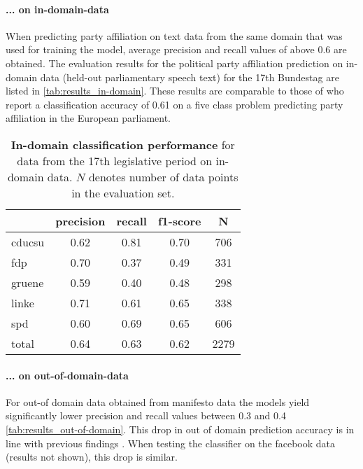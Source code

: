 \documentclass[11pt]{article}
\begin{document}
\paragraph{... on in-domain-data}
When predicting party affiliation on text data from the same domain that was used for training the model, average precision and recall values of above 0.6 are obtained. The evaluation results for the political party affiliation prediction on in-domain data (held-out parliamentary speech text) for the 17th Bundestag are listed in \autoref{tab:results_in-domain}.
These results are comparable to those of \cite{Hirst2014} who report a classification accuracy of 0.61 on a five class problem predicting party affiliation in the European parliament.


\begin{table}[t]
\caption{
\label{tab:results_in-domain}
{\bf In-domain classification performance} for data from the 17th legislative period on in-domain data. $N$ denotes number of data points in the evaluation set.
}
\begin{center}
\begin{tabular}{lcccc}
    &         precision    &recall &  f1-score  & N  \\
\hline \hline
       cducsu   &    0.62  &    0.81  &    0.70  &     706\\
        fdp    &   0.70   &   0.37  &    0.49    &   331\\
     gruene &      0.59  &    0.40   &   0.48   &    298\\
      linke    &   0.71   &   0.61  &    0.65    &   338\\
        spd   &    0.60   &   0.69  &    0.65   &    606\\
\hline
 total &      0.64   &   0.63   &   0.62    &  2279 
%
\end{tabular}
\end{center}
\end{table}


\paragraph{... on out-of-domain-data}
For out-of domain data obtained from manifesto data the models yield significantly lower precision and recall values between 0.3 and 0.4 \autoref{tab:results_out-of-domain}. This drop in out of domain prediction accuracy is in line with previous findings \cite{Yu2008}. When testing the classifier on the facebook data (results not shown), this drop is similar.
\end{document}
